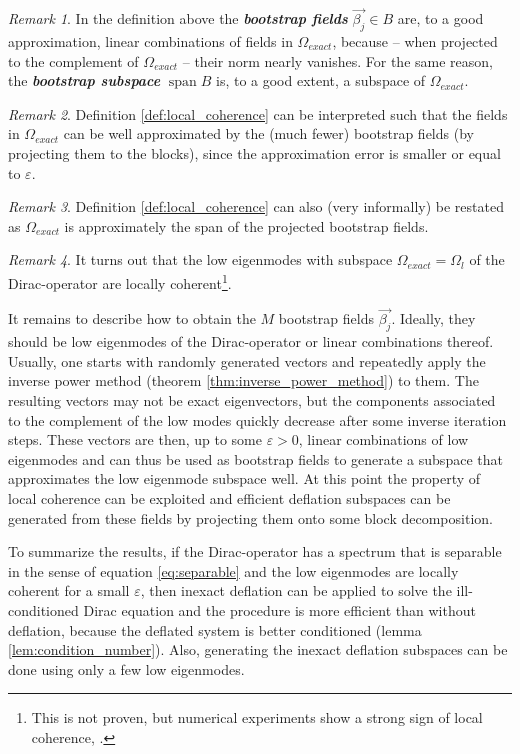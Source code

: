 \documentclass{article}
\DeclareMathOperator{\spn}{span} %
\theoremstyle{plain} %
\theoremstyle{convention} %
\theoremstyle{remark} %
\newtheorem*{remark}{Remark} %
\def\df#1{\textbf{\textit{#1}}}
\numberwithin{equation}{section}
\begin{document}
\begin{remark}
In the definition above the \df{bootstrap fields} $\vec{\beta_j} \in B$ are, to a good approximation, linear combinations of fields in $\Omega_{exact}$, because -- when projected to the complement of $\Omega_{exact}$ -- their norm nearly vanishes. For the same reason, the \df{bootstrap subspace} $\spn{B}$ is, to a good extent, a subspace of $\Omega_{exact}$.
\end{remark}

\begin{remark}
Definition \ref{def:local_coherence} can be interpreted such that the fields in $\Omega_{exact}$ can be well approximated by the (much fewer) bootstrap fields (by projecting them to the blocks), since the approximation error is smaller or equal to $\varepsilon$.
\end{remark}

\begin{remark}
Definition \ref{def:local_coherence} can also (very informally) be restated as $\Omega_{exact}$ is approximately the span of the projected bootstrap fields.
\end{remark}

\begin{remark}
It turns out that the low eigenmodes with subspace $\Omega_{exact} = \Omega_l$ of the Dirac-operator are locally coherent\footnote{This is not proven, but numerical experiments show a strong sign of local coherence, \cite{luscher2007}.}.
\end{remark}

It remains to describe how to obtain the $M$ bootstrap fields $\vec{\beta_j}$. Ideally, they should be low eigenmodes of the Dirac-operator or linear combinations thereof. Usually, one starts with randomly generated vectors and repeatedly apply the inverse power method (theorem \ref{thm:inverse_power_method}) to them. The resulting vectors may not be exact eigenvectors, but the components associated to the complement of the low modes quickly decrease after some inverse iteration steps. These vectors are then, up to some $\varepsilon > 0$, linear combinations of low eigenmodes and can thus be used as bootstrap fields to generate a subspace that approximates the low eigenmode subspace well. At this point the property of local coherence can be exploited and efficient deflation subspaces can be generated from these fields by projecting them onto some block decomposition.

To summarize the results, if the Dirac-operator has a spectrum that is separable in the sense of equation \eqref{eq:separable} and the low eigenmodes are locally coherent for a small $\varepsilon$, then inexact deflation can be applied to solve the ill-conditioned Dirac equation and the procedure is more efficient than without deflation, because the deflated system is better conditioned (lemma \ref{lem:condition_number}). Also, generating the inexact deflation subspaces can be done using only a few low eigenmodes.
\end{document}
